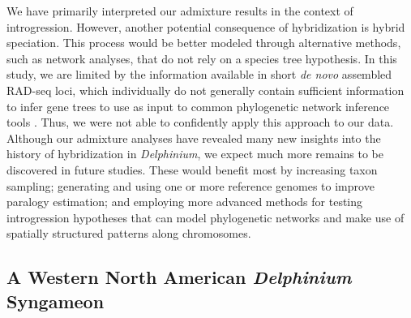 \documentclass[11pt]{article}
\begin{document}
We have primarily interpreted our admixture results in the context of introgression. However, another potential consequence of hybridization is hybrid speciation.
% 
This process would be better modeled through alternative methods, such as network
analyses, that do not rely on a species tree hypothesis. 
% 
In this study, we are limited by the information available in short 
\emph{de novo} assembled RAD-seq loci, which individually do not 
generally contain sufficient information to infer gene trees to use as
input to common phylogenetic network inference tools \citep{solis-lemus_inferring_2016}.
% 
Thus, we were not able to confidently apply this approach to our data. 
% 
Although our admixture analyses have revealed many new insights into the history of 
hybridization in \emph{Delphinium}, we expect much more remains to be discovered in
future studies. 
These would benefit most by increasing taxon sampling; generating and using one or
more reference genomes to improve paralogy estimation; and employing more advanced
methods for testing introgression hypotheses that can model phylogenetic networks
and make use of spatially structured patterns along chromosomes.


\subsection{A Western North American \emph{Delphinium} Syngameon}
\end{document}
